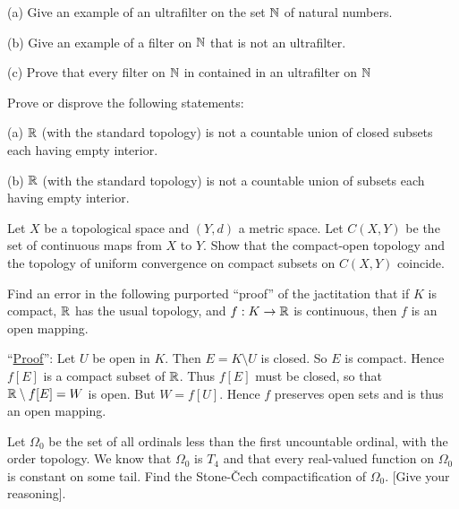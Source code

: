 \documentclass[12pt]{article}
\begin{document}
\vspace{10pt}
(a) Give an example of an ultrafilter on the set $\Bbb N$ of natural numbers.

(b) Give an example of a filter on $\Bbb N$ that is not an ultrafilter.

(c) Prove that every filter on $\Bbb N$ in contained in an
ultrafilter on $\Bbb N$

\vspace{10pt}
Prove or disprove the following statements:

(a) ${\Bbb R}$ (with the standard topology) is not a countable union
	of closed subsets each having empty interior.

(b)  ${\Bbb R}$ (with the standard topology) is not a countable union
	of subsets each having empty interior.


\vspace{10pt}
Let $X$ be a topological space and $(Y, d)$ a metric space.
Let $C(X, Y)$ be the set of continuous maps from $X$ to $Y$. Show that
the compact-open topology  and the topology of uniform
convergence on compact subsets on $C(X, Y)$ coincide.

\vspace{10pt}
Find an error in the following purported ``proof''
of the jactitation that if $K$ is compact, $\Bbb R$ has the usual topology,
 and $f: K\rightarrow \Bbb R$ is continuous, then $f$ is an open mapping.

\noindent
``\underline{\sc Proof}'':
Let $U$ be open in $K$. Then $E=K\setminus U$ is closed.  So $E$ is compact.
  Hence $f[E]$ is a compact subset of $\Bbb R$.  Thus $f[E]$ must be closed,
so that $\Bbb R \setminus f[E]=W$ is open.  But $W=f[U]$.  Hence $f$
preserves open sets and is thus an open mapping.

\vspace{10pt}
Let $\Omega_0$ be the set of all ordinals less than the first uncountable
ordinal, with the order topology.  We know that $\Omega_0$ is $T_4$ and
that every real-valued function on $\Omega_0$ is constant on some tail.
Find the Stone-\v Cech compactification of $\Omega_0$. [Give your reasoning].
\end{document}
